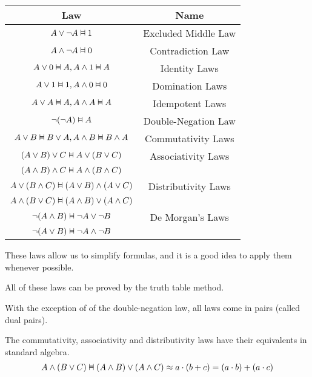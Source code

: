 \documentclass{article}
\newcommand{\vDashv}{%
  \mathrel{%
    \text{%
      \ooalign{$\vDash$\cr\reflectbox{$\vDash$}\cr}%
    }%
  }%
}
\begin{document}
\begin{table}[h]
    \centering
    \begin{tabular}{|c|c|} \hline
         Law& Name\\ \hline
         $A \vee \neg A \vDashv 1$& Excluded Middle Law\\\hline
         $A \wedge \neg A \vDashv 0$& Contradiction Law\\\hline
         $A \vee 0 \vDashv A, A \wedge 1 \vDashv A$& Identity Laws\\\hline
         $A \vee 1 \vDashv 1, A \wedge 0 \vDashv 0$& Domination Laws\\\hline
         $A \vee A \vDashv A, A \wedge A \vDashv A$& Idempotent Laws\\\hline
         $\neg (\neg A) \vDashv A$& Double-Negation Law\\\hline
         $A \vee B \vDashv B \vee A, A \wedge B \vDashv B \wedge A$& Commutativity Laws\\\hline
         $(A \vee B) \vee C \vDashv A \vee (B \vee C)$& Associativity Laws\\
         $(A \wedge B) \wedge C \vDashv A \wedge (B \wedge C)$& \\\hline
         $A \vee (B \wedge C) \vDashv (A \vee B) \wedge (A \vee C)$& Distributivity Laws\\
         $A \wedge (B \vee C) \vDashv (A \wedge B) \vee (A \wedge C)$& \\ \hline
         $\neg (A \wedge B) \vDashv \neg A \vee \neg B$&De Morgan's Laws\\
         $\neg (A \vee B) \vDashv \neg A \wedge \neg B$& \\ \hline
    \end{tabular}
\end{table}

These laws allow us to simplify formulas, and it is a good idea to apply them whenever possible. 

All of these laws can be proved by the truth table method. 

With the exception of of the double-negation law, all laws come in pairs (called dual pairs). 

The commutativity, associativity and distributivity laws have their equivalents in standard algebra. 
\begin{align*}
A \wedge (B \vee C) \vDashv (A \wedge B) \vee (A \wedge C) \approx a \cdot (b + c) = (a \cdot b) + (a \cdot c)
\end{align*}
\end{document}
